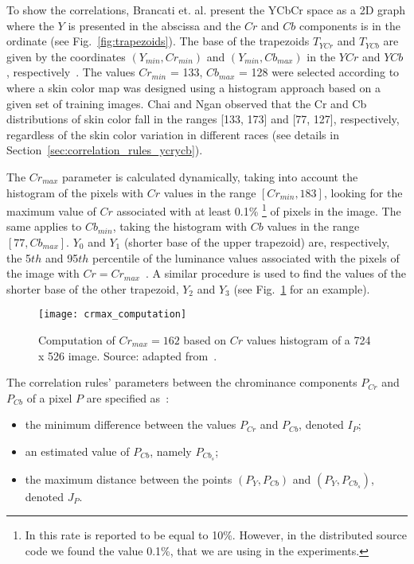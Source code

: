 To show the correlations, Brancati et. al. present the YCbCr space as a 2D graph where the $Y$ is presented in the abscissa and the $Cr$ and $Cb$ components is in the ordinate (see Fig.~\ref{fig:trapezoids}). The base of the trapezoids $T_{YCr}$ and $T_{YCb}$ are given by the coordinates $(Y_{min}, Cr_{min})$ and $(Y_{min}, Cb_{max})$ in the $YCr$ and $YCb$ , respectively~\citep{brancati:17}. The values $Cr_{min}$ = 133, $Cb_{max}$ = 128 were selected according to~\citet{chai:99} where a skin color map was designed using a histogram approach based on a given set of training images. Chai and Ngan observed that the Cr and Cb distributions of skin color fall in the ranges [133, 173] and [77, 127], respectively, regardless of the skin color variation in different races (see details in Section~\ref{sec:correlation_rules_ycrycb}).

The $Cr_{max}$ parameter is calculated dynamically, taking into account the histogram of the pixels with $Cr$ values in the range $[Cr_{min}, 183]$, looking for the maximum value of $Cr$ associated with at least 0.1\% \footnote{In \citet{brancati:17} this rate is reported to be equal to 10\%. However, in the distributed source code we found the value 0.1\%, that we are using in the experiments.} of pixels in the image. The same applies to $Cb_{min}$, taking the histogram with $Cb$ values in the range $[77, Cb_{max}]$. $Y_0$ and $Y_1$ (shorter base of the upper trapezoid) are, respectively, the 5${th}$ and 95$th$ percentile of the luminance values associated with the pixels of the image with $Cr = Cr_{max}$~\citep{brancati:17}. A similar procedure is used to find the values of the shorter base of the other trapezoid, $Y_2$ and $Y_3$ (see Fig.~\ref{fig:crmax_computation} for an example).

\begin{figure}[ht]
    \centering
    \texttt{[image: crmax\_computation]}
    \caption[Computation of $Cr_{max}$ based on $Cr$ values histogram of a 724 x 526 image]{Computation of $Cr_{max} = 162$ based on $Cr$ values histogram of a 724 x 526 image. Source: adapted from~\citep{brancati:17}.}
    \label{fig:crmax_computation}
\end{figure}

The correlation rules' parameters between the chrominance components $P_{Cr}$ and $P_{Cb}$ of a pixel $P$ are specified as~\citep{brancati:17}:
\begin{itemize}
    \item the minimum difference between the values $P_{Cr}$ and $P_{Cb}$, denoted $I_P$;
    \item an estimated value of $P_{Cb}$, namely $P_{Cb_s}$;
    \item the maximum distance between the points $(P_Y, P_{Cb})$ and $(P_Y, P_{Cb_s})$, denoted $J_P$.
\end{itemize}

